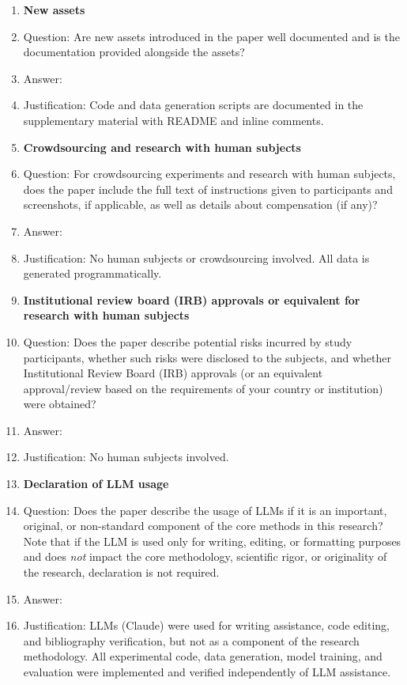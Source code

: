 \documentclass{article}
\begin{document}
\begin{enumerate}
\item {\bf New assets}
    \item[] Question: Are new assets introduced in the paper well documented and is the documentation provided alongside the assets?
    \item[] Answer: \answerYes{}
    \item[] Justification: Code and data generation scripts are documented in the supplementary material with README and inline comments.

\item {\bf Crowdsourcing and research with human subjects}
    \item[] Question: For crowdsourcing experiments and research with human subjects, does the paper include the full text of instructions given to participants and screenshots, if applicable, as well as details about compensation (if any)?
    \item[] Answer: \answerNA{}
    \item[] Justification: No human subjects or crowdsourcing involved. All data is generated programmatically.

\item {\bf Institutional review board (IRB) approvals or equivalent for research with human subjects}
    \item[] Question: Does the paper describe potential risks incurred by study participants, whether such risks were disclosed to the subjects, and whether Institutional Review Board (IRB) approvals (or an equivalent approval/review based on the requirements of your country or institution) were obtained?
    \item[] Answer: \answerNA{}
    \item[] Justification: No human subjects involved.

\item {\bf Declaration of LLM usage}
    \item[] Question: Does the paper describe the usage of LLMs if it is an important, original, or non-standard component of the core methods in this research? Note that if the LLM is used only for writing, editing, or formatting purposes and does \emph{not} impact the core methodology, scientific rigor, or originality of the research, declaration is not required.
    \item[] Answer: \answerNA{}
    \item[] Justification: LLMs (Claude) were used for writing assistance, code editing, and bibliography verification, but not as a component of the research methodology. All experimental code, data generation, model training, and evaluation were implemented and verified independently of LLM assistance.

\end{enumerate}
\end{document}
